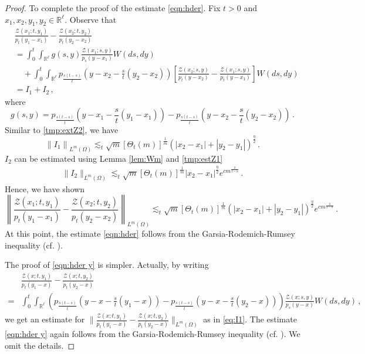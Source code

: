 \documentclass[12pt,reqno]{amsart}
\theoremstyle{remark}
\newcommand{\1}{\mathbf{1}}
\def\RR{\mathbb{R}}
\def\Z{\mathcal{Z}}
\def\lt{\left}
\def\rt{\right}
\begin{document}
\begin{proof}
		To complete the proof of the estimate \eqref{eqn:hder}. Fix $t>0$ and $x_1,x_2,y_1,y_2\in\RR^\ell$. Observe that
		\begin{align*}
			&\frac{\Z(x_1;t,y_1)}{p_t(y_1-x_1)}-\frac{\Z(x_2;t,y_2)}{p_t(y_2-x_2)}
			\\&=\int_0^t\int_{\RR^\ell} g(s,y) \frac{\Z(x_1;s,y)}{p_s(y-x_1)} W(ds,dy)
			\\&\quad+\int_0^t\int_{\RR^\ell}p_{\frac{s(t-s)}t}\lt(y-x_2-\frac st(y_2-x_2) \rt)
			\lt[\frac{\Z(x_2;s,y)}{p_t(y-x_2)}-\frac{\Z(x_1;s,y)}{p_t(y-x_1)}\rt]W(ds,dy)
			\\&=I_1+I_2\,,
		\end{align*}
		where
		\begin{equation*}
			g(s,y)=p_{\frac{s(t-s)}{t}} \left(y-x_1-\frac{s}{t}(y_1-x_1)\right) - p_{\frac{s(t-s)}{t}}\left(y-x_2-\frac{s}{t}(y_2-x_2)\right)\,.
		\end{equation*}
		Similar to \eqref{tmp:extZ2}, we have
		\begin{equation}\label{eq:I1}
			\lt\|I_1\rt\|_{L^m(\Omega)}
			\lesssim_t\sqrt{m} [\Theta_t(m)]^{\frac1m}(|x_2-x_1|+|y_2-y_1|)^{\frac \eta2} \,. 
		\end{equation}
		$I_2$ can be estimated using Lemma \ref{lem:Wm} and \eqref{tmp:estZ1}
		\begin{align*}
			\|I_2\|_{L^m(\Omega)}\lesssim_t \sqrt{m} [\Theta_t(m)]^{\frac1m}|x_2-x_1|^{\frac \eta2} e^{c m ^{\frac{2}{2-\alpha}}}\,. 
		\end{align*}
		Hence, we have shown
		\begin{equation*}
			\lt\|\frac{\Z(x_1;t,y_1)}{p_t(y_1-x_1)}-\frac{\Z(x_2;t,y_2)}{p_t(y_2-x_2)}\rt\|_{L^m(\Omega)}\lesssim_t\sqrt{m} [\Theta_t(m)]^{\frac1m}(|x_2-x_1|+|y_2-y_1|)^{\frac \eta2} e^{cm^{\frac{2}{2-\alpha}}} \,.
		\end{equation*}
		At this point, the estimate \eqref{eqn:hder} follows from the Garsia-Rodemich-Rumsey inequality (cf. \cite{garsiarodemich}).
		
		The proof of \eqref{eqn:hder y} is simpler. Actually, by writing 
		\begin{align*}
		&\frac{\Z(x;t,y_1)}{p_t(y_1-x)}-\frac{\Z(x;t,y_2)}{p_t(y_2-x)}\\
				=&\int_0^t\int_{\RR^\ell} \left(p_{\frac{s(t-s)}{t}} \left(y-x-\frac{s}{t}(y_1-x)\right) - p_{\frac{s(t-s)}{t}}\left(y-x-\frac{s}{t}(y_2-x)\right) \right) \frac{\Z(x;s,y)}{p_s(y-x)} W(ds,dy)\,,
		\end{align*}	
		we get an estimate for $\|\frac{\Z(x;t,y_1)}{p_t(y_1-x)}-\frac{\Z(x;t,y_2)}{p_t(y_2-x)}\|_{L^m(\Omega)}$  as in \eqref{eq:I1}. The estimate 	\eqref{eqn:hder y} again follows from the Garsia-Rodemich-Rumsey inequality (cf. \cite{garsiarodemich}). We omit the details. 	
	\end{proof}
\end{document}
